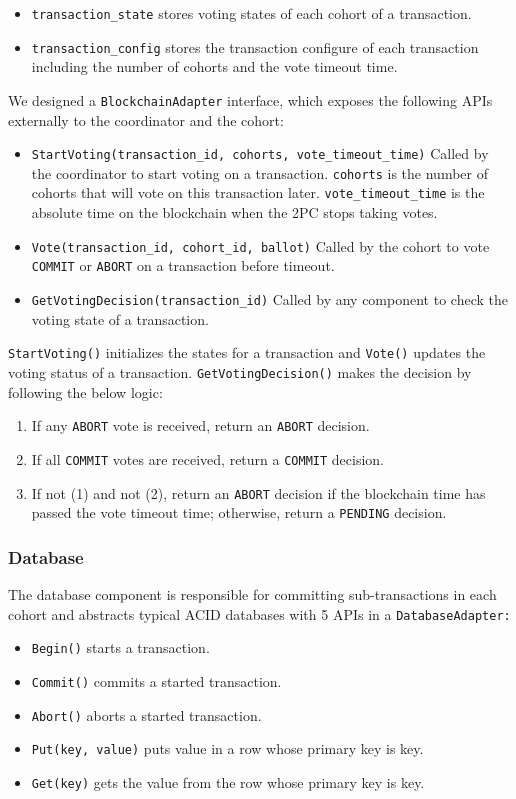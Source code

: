 \documentclass[11pt,conference]{IEEEtran}
\begin{document}
\begin{itemize}
  \item \texttt{transaction\_state} stores voting states of each cohort of a transaction.
  \item \texttt{transaction\_config} stores the transaction configure of each transaction including the number of cohorts and the vote timeout time.
\end{itemize}

We designed a \texttt{BlockchainAdapter} interface, which exposes the following APIs externally to the coordinator and the cohort:
\begin{itemize}
  \item \texttt{StartVoting(transaction\_id, cohorts, vote\_timeout\_time)} Called by the coordinator to start voting on a transaction. \texttt{cohorts} is the number of cohorts that will vote on this transaction later. \texttt{vote\_timeout\_time} is the absolute time on the blockchain when the 2PC stops taking votes.
  \item \texttt{Vote(transaction\_id, cohort\_id, ballot)} Called by the cohort to vote \texttt{COMMIT} or \texttt{ABORT} on a transaction before timeout.
  \item \texttt{GetVotingDecision(transaction\_id)} Called by any component to check the voting state of a transaction.
\end{itemize}

\texttt{StartVoting()} initializes the states for a transaction and \texttt{Vote()} updates the voting status of a transaction. \texttt{GetVotingDecision()} makes the decision by following the below logic:
\begin{enumerate}
  \item If any \texttt{ABORT} vote is received, return an \texttt{ABORT} decision.
  \item If all \texttt{COMMIT} votes are received, return a \texttt{COMMIT} decision.
  \item If not (1) and not (2), return an \texttt{ABORT} decision if the blockchain time has passed the vote timeout time; otherwise, return a \texttt{PENDING} decision.
\end{enumerate}

\subsubsection{Database} \label{database}
The database component is responsible for committing sub-transactions in each cohort and abstracts typical ACID databases with 5 APIs in a \texttt{DatabaseAdapter:} 
\begin{itemize}
  \item \texttt{Begin()} starts a transaction.
  \item \texttt{Commit()} commits a started transaction.
  \item \texttt{Abort()} aborts a started transaction.
  \item \texttt{Put(key, value)} puts value in a row whose primary key is key.
  \item \texttt{Get(key)} gets the value from the row whose primary key is key.
\end{itemize}
\end{document}
